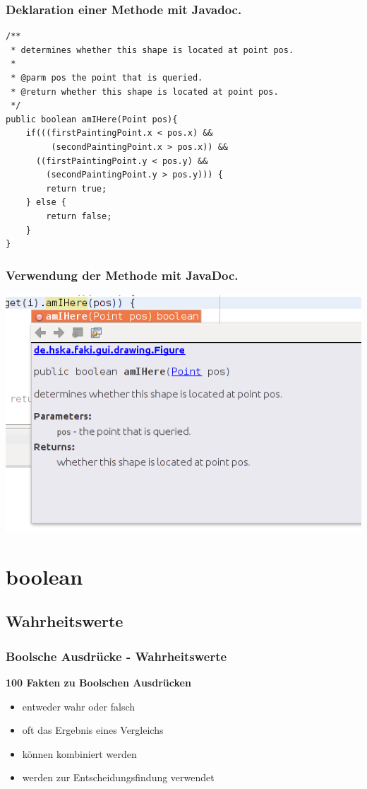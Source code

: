\documentclass[final]{beamer}
\begin{document}
\begin{frame}[containsverbatim]
	\frametitle{Deklaration einer Methode mit Javadoc.}
	\begin{lstlisting}
/**
 * determines whether this shape is located at point pos.
 *
 * @parm pos the point that is queried.
 * @return whether this shape is located at point pos.
 */
public boolean amIHere(Point pos){
	if(((firstPaintingPoint.x < pos.x) &&
		 (secondPaintingPoint.x > pos.x)) &&
	  ((firstPaintingPoint.y < pos.y) &&
		(secondPaintingPoint.y > pos.y))) {
		return true;
	} else {
		return false;
	}
}
	\end{lstlisting}
\end{frame}

\begin{frame}
	\frametitle{Verwendung der Methode mit JavaDoc.}
	\includegraphics[scale=0.5]{JavaDoc_example_2_1.png}
\end{frame}

\section{boolean}
\subsection{Wahrheitswerte}
\begin{frame}
	\frametitle{Boolsche Ausdrücke - Wahrheitswerte}
	\textbf{100 Fakten zu Boolschen Ausdrücken}
	\begin{itemize}
		\item{entweder wahr oder falsch}
		\item{oft das Ergebnis eines Vergleichs}
		\item{können kombiniert werden}
		\item{werden zur Entscheidungsfindung verwendet}
	\end{itemize}
\end{frame}
\end{document}
